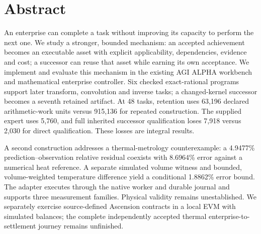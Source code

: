 \documentclass[11pt,a4paper]{article}
\begin{document}
\begin{titlepage}
\mbox{}
\end{titlepage}
\setcounter{page}{2}
\section*{Abstract}
An enterprise can complete a task without improving its capacity to perform the next one. We study a stronger, bounded mechanism: an accepted achievement becomes an executable asset with explicit applicability, dependencies, evidence and cost; a successor can reuse that asset while earning its own acceptance. We implement and evaluate this mechanism in the existing AGI ALPHA workbench and mathematical enterprise controller. Six checked exact-rational programs support later transform, convolution and inverse tasks; a changed-kernel successor becomes a seventh retained artifact. At 48 tasks, retention uses 63,196 declared arithmetic-work units versus 915,136 for repeated construction. The supplied expert uses 5,760, and full inherited successor qualification loses 7,918 versus 2,030 for direct qualification. These losses are integral results.

A second construction addresses a thermal-metrology counterexample: a 4.9477\% prediction--observation relative residual coexists with 8.6964\% error against a numerical heat reference. A separate simulated volume witness and bounded, volume-weighted temperature difference yield a conditional 1.8862\% error bound. The adapter executes through the native worker and durable journal and supports three measurement families. Physical validity remains unestablished. We separately exercise source-defined Ascension contracts in a local EVM with simulated balances; the complete independently accepted thermal enterprise-to-settlement journey remains unfinished.
\end{document}
